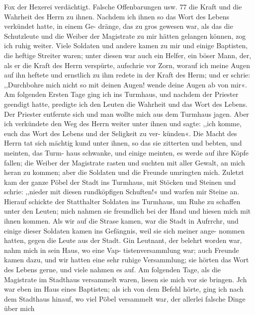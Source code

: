 Fox der Hexerei verdächtigt. Falsche Offenbarungen usw. 77
die Kraft und die Wahrheit des Herrn zu ihnen. Nachdem ich
ihnen so das Wort des Lebens verkündet hatte, in einem Ge-
dränge, das zu gros gewesen war, als das die Schutzleute und
die Weiber der Magistrate zu mir hätten gelangen können, zog
ich ruhig weiter. Viele Soldaten und andere kamen zu mir und
einige Baptisten, die heftige Streiter waren; unter diesen war
auch ein Helfer, ein böser Mann, der, als er die Kraft des Herrn
verspürte, aufschrie vor Zorn, worauf ich meine Augen auf ihn
heftete und ernstlich zu ihm redete in der Kraft des Herm; und
er schrie: ,,Durchbohre mich nicht so mit deinen Augen! wende
deine Augen ab von mir«.
Am folgenden Ersten Tage ging ich ins Turmhaus, und
nachdem der Priester geendigt hatte, predigte ich den Leuten
die Wahrheit und das Wort des Lebens. Der Priester entfernte
sich und man wollte mich aus dem Turmhaus jagen. Aber ich
verkündete den Weg des Herrn weiter unter ihnen und sagte:
,,ich komme, euch das Wort des Lebens und der Seligkeit zu ver-
künden«. Die Macht des Herrn tat sich mächtig kund unter
ihnen, so das sie zitterten und bebten, und meinten, das Turm-
haus schwanke, und einige meinten, es werde auf ihre Köpfe fallen;
die Weiber der Magistrate rasten und suchten mit aller Gewalt,
an mich heran zu kommen; aber die Soldaten und die Freunde
umringten mich. Zuletzt kam der ganze Pöbel der Stadt ins
Turmhaus, mit Stöcken und Steinen und schrie: ,,nieder mit
diesen rundköpfigen Schuften!« und warfen mir Steine an.
Hierauf schickte der Statthalter Soldaten ins Turmhaus, um
Ruhe zu schaffen unter den Leuten; mich nahmen sie freundlich
bei der Hand und hiesen mich mit ihnen kommen. Als wir
auf die Strase kamen, war die Stadt in Aufrrchr, und einige
dieser Soldaten kamen ins Gefängnis, weil sie sich meiner ange-
nommen hatten, gegen die Leute aus der Stadt. Gin Leutnant,
der belehrt worden war, nahm mich in sein Haus, wo eine Vap-
tistenversammlung war; auch Freunde kamen dazu, und wir hatten
eine sehr ruhige Versammlung; sie hörten das Wort des Lebens
gerne, und viele nahmen es auf. Am folgenden Tage, als die
Magistrate im Stadthaus versammelt waren, liesen sie mich vor
sie bringen. Jch war eben im Haus eines Baptisten; als ich
von dem Befehl hörte, ging ich nach dem Stadthaus hinauf, wo
viel Pöbel versammelt war, der allerlei falsche Dinge über mich


